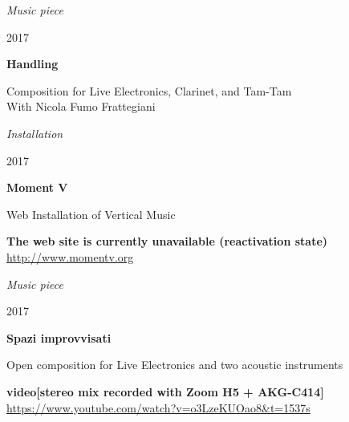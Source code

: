 \documentclass[7pt,a4paper]{article}
\begin{document}
\begin{mdframed}[
    backgroundcolor=entrygray,
    linecolor=entrygray,
    linewidth=0pt,
    innerleftmargin=6pt,
    innerrightmargin=6pt,
    innertopmargin=6pt,
    innerbottommargin=6pt,
    skipabove=0pt,
    skipbelow=0pt
]

\scriptsize \textit{Music piece}
\par \small 2017
\par \normalsize \textbf{Handling}
\par \small Composition for Live Electronics, Clarinet, and Tam-Tam\\With Nicola Fumo Frattegiani



\vspace{0.5cm}
\end{mdframed}


\begin{mdframed}[
    backgroundcolor=white,
    linecolor=white,
    linewidth=0pt,
    innerleftmargin=6pt,
    innerrightmargin=6pt,
    innertopmargin=6pt,
    innerbottommargin=6pt,
    skipabove=0pt,
    skipbelow=0pt
]

\scriptsize \textit{Installation}
\par \small 2017
\par \normalsize \textbf{Moment V}
\par \small Web Installation of Vertical Music


\par \scriptsize \textbf{The web site is currently unavailable (reactivation state)} \href{http://www.momentv.org}{http://www.momentv.org}


\vspace{0.5cm}
\end{mdframed}


\begin{mdframed}[
    backgroundcolor=entrygray,
    linecolor=entrygray,
    linewidth=0pt,
    innerleftmargin=6pt,
    innerrightmargin=6pt,
    innertopmargin=6pt,
    innerbottommargin=6pt,
    skipabove=0pt,
    skipbelow=0pt
]

\scriptsize \textit{Music piece}
\par \small 2017
\par \normalsize \textbf{Spazi improvvisati}
\par \small Open composition for Live Electronics and two acoustic instruments


\par \scriptsize \textbf{video[stereo mix recorded with Zoom H5 + AKG-C414]} \href{https://www.youtube.com/watch?v=o3LzeKUOao8\&t=1537s}{https://www.youtube.com/watch?v=o3LzeKUOao8\&t=1537s}


\vspace{0.5cm}
\end{mdframed}
\end{document}
